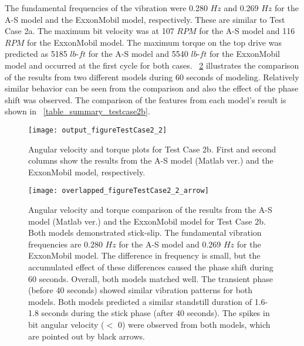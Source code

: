 The fundamental frequencies of the vibration were 0.280 $Hz$ and 0.269 $Hz$ for the A-S model and the ExxonMobil model, respectively.  These are similar to Test Case 2a. The maximum bit velocity was at 107 $RPM$ for the A-S model and 116 $RPM$ for the ExxonMobil model. The maximum torque on the top drive was predicted as 5185 $lb\mbox{-}ft$ for the A-S model and 5540 $lb\mbox{-}ft$ for the ExxonMobil model and occurred at the first cycle for both cases. \figurename~\ref{figure_testcase2_2_overlapped} illustrates the comparison of the results from two different models during 60 seconds of modeling. Relatively similar behavior can be seen from the comparison and also the effect of the phase shift was observed. The comparison of the features from each model's result is shown in \tablename~\ref{table_summary_testcase2b}.

\begin{figure}
  \centering
  \texttt{[image: output\_figureTestCase2\_2]}
  \caption[Angular velocity and torque plots for Test Case 2b]{Angular velocity and torque plots for Test Case 2b. First and second columns show the results from the A-S model (Matlab ver.) and the ExxonMobil model, respectively.}\label{figure_testcase2_2}
\end{figure}

\begin{figure}
  \centering
  \texttt{[image: overlapped\_figureTestCase2\_2\_arrow]}
  \caption[Angular velocity and torque comparison plots for Test Case 2b]{Angular velocity and torque comparison of the results from the A-S model (Matlab ver.) and the ExxonMobil model for Test Case 2b. Both models demonstrated stick-slip. The fundamental vibration frequencies are 0.280 $Hz$ for the A-S model and 0.269 $Hz$ for the ExxonMobil model. The difference in frequency is small, but the accumulated effect of these differences caused the phase shift during 60 seconds. Overall, both models matched well. The transient phase (before 40 seconds) showed similar vibration patterns for both models. Both models predicted a similar standstill duration of 1.6-1.8 seconds during the stick phase (after 40 seconds). The spikes in bit angular velocity ($<$ 0) were observed from both models, which are pointed out by black arrows.}\label{figure_testcase2_2_overlapped}
\end{figure}

